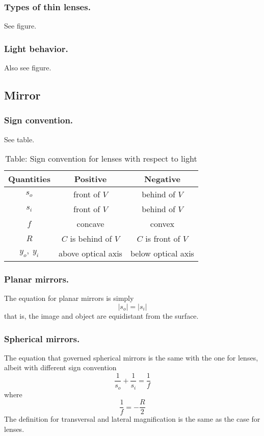 \documentclass[../../../main.tex]{subfiles}
\begin{document}
\subsubsection{Types of thin lenses.} See figure.

\subsubsection{Light behavior.} Also see figure.

\subsection{Mirror}

\subsubsection{Sign convention.} See table.
\begin{table}
    \centering
    \caption*{Table: Sign convention for lenses with respect to light}
    \begin{tabular}{ccc }
        \toprule
        Quantities & Positive & Negative\\ 
        \midrule
        $s_o$& front of $V $ & behind of $V $ \\ 
    $s_i$& front of $V $ & behind of $V $\\
    $f$& concave & convex \\
    $R$& $C$ is behind of $V $ & $C$ is front of $V $\\
    $y_o,\;y_i$& above optical axis &below optical axis\\
        \bottomrule
    \end{tabular}
\end{table}

\subsubsection{Planar mirrors.} The equation for planar mirrors is simply
\begin{equation*}
    |s_o|=|s_i|
\end{equation*}
that is, the image and object  are equidistant from the surface.

\subsubsection{Spherical mirrors.} The equation that governed spherical mirrors is the same with the one for lenses, albeit with different sign convention
 \begin{equation*}
    \frac{1}{s_o}+\frac{1}{s_i}=\frac{1}{f}
 \end{equation*}
 where
 \begin{equation*}
     \frac{1}{f}=-\frac{R}{2}
 \end{equation*}
The definition for transversal and lateral magnification is the same as the case for lenses. 
\end{document}
